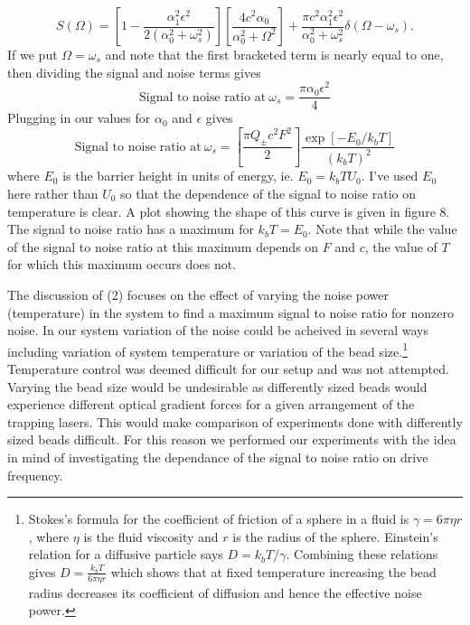 \documentclass{report}
\begin{document}
\begin{displaymath}
S(\Omega)=\left[ 1-\frac{\alpha_1^2\epsilon^2}{2(\alpha_0^2+\omega_s^2)}\right]\left[\frac{4c^2\alpha_0}{\alpha_0^2+\Omega^2}\right]+\frac{\pi c^2 \alpha_1^2 \epsilon^2}{\alpha_0^2+\omega_s^2}\delta (\Omega-\omega_s).
\end{displaymath}
If we put $\Omega = \omega_s$ and note that the first bracketed term is nearly equal to one, then dividing the signal and noise terms gives
\begin{displaymath}
\textrm{Signal to noise ratio at}~\omega_s = \frac{\pi \alpha_0 \epsilon^2}{4}
\end{displaymath}
Plugging in our values for $\alpha_0$ and $\epsilon$ gives
\begin{displaymath}
\textrm{Signal to noise ratio at}~\omega_s = \left[\frac{\pi Q_{\pm}c^2F^2}{2}\right]
\frac{\exp\left[-E_0/k_bT\right]}{(k_bT)^2}
\end{displaymath}
where $E_0$ is the barrier height in units of energy, ie. $E_0=k_bTU_0$. I've used $E_0$ here rather than $U_0$ so that the dependence of the signal to noise ratio on temperature is clear. A plot showing the shape of this curve is given in figure 8. The signal to noise ratio has a maximum for $k_bT=E_0$. Note that while the value of the signal to noise ratio at this maximum depends on $F$ and $c$, the value of $T$ for which this maximum occurs does not.

The discussion of (2) focuses on the effect of varying the noise power (temperature) in the system to find a maximum signal to noise ratio for nonzero noise. In our system variation of the noise could be acheived in several ways including variation of system temperature or variation of the bead size.\footnote{Stokes's formula for the coefficient of friction of a sphere in a fluid is $\gamma = 6 \pi \eta r$, where $\eta$ is the fluid viscosity and $r$ is the radius of the sphere. Einstein's relation for a diffusive particle says $D=k_bT/\gamma$. Combining these relations gives $D=\frac{k_bT}{6\pi\eta r}$ which shows that at fixed temperature increasing the bead radius decreases its coefficient of diffusion and hence the effective noise power.} Temperature control was deemed difficult for our setup and was not attempted. Varying the bead size would be undesirable as differently sized beads would experience different optical gradient forces for a given arrangement of the trapping lasers. This would make comparison of experiments done with differently sized beads difficult. For this reason we performed our experiments with the idea in mind of investigating the dependance of the signal to noise ratio on drive frequency.
\end{document}
